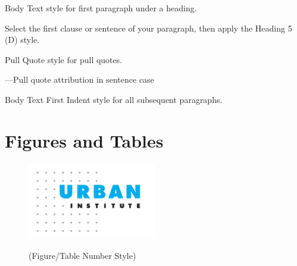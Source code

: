 Body Text style for first paragraph under a heading.

 Select the first clause or sentence of your paragraph, then apply the Heading 5 (D) style. 

Pull Quote style for pull quotes.

---Pull quote attribution in sentence case

Body Text First Indent style for all subsequent paragraphs.


\newpage
\part{Figures and Tables}

\begin{figure}[htbp]
    \caption{(Figure/Table Number Style)}
    \centering
    \includegraphics[width=0.5\textwidth]{images/logo.png}
    \label{fig:my_label}
\end{figure}
\begin{singlespace}
    \\
\end{singlespace}



